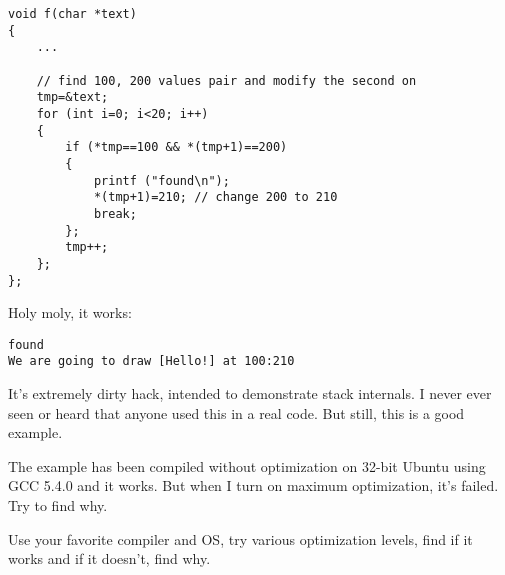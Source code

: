 \begin{lstlisting}[style=customc]
void f(char *text)
{
	...

	// find 100, 200 values pair and modify the second on
	tmp=&text;
	for (int i=0; i<20; i++)
	{
		if (*tmp==100 && *(tmp+1)==200)
		{
			printf ("found\n");
			*(tmp+1)=210; // change 200 to 210
			break;
		};
		tmp++;
	};
};
\end{lstlisting}

Holy moly, it works:

\begin{lstlisting}
found
We are going to draw [Hello!] at 100:210
\end{lstlisting}


It's extremely dirty hack, intended to demonstrate stack internals.
I never ever seen or heard that anyone used this in a real code.
But still, this is a good example.

\myparagraph{\Exercise}

The example has been compiled without optimization on 32-bit Ubuntu using GCC 5.4.0 and it works.
But when I turn on  maximum optimization, it's failed.
Try to find why.

Use your favorite compiler and OS, try various optimization levels, find if it works and if it doesn't, find why.


